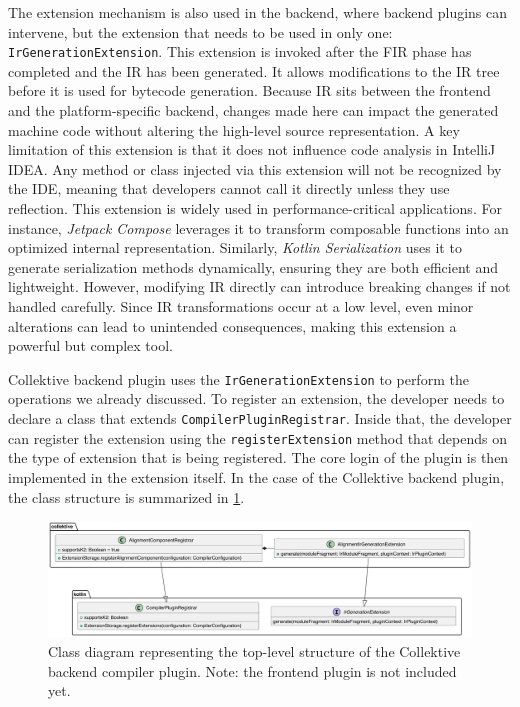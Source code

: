\documentclass[12pt,a4paper,openright,twoside]{book}
\begin{document}
The extension mechanism is also used in the backend, where backend plugins can
intervene, but the extension that needs to be used in only one:
\lstinline{IrGenerationExtension}. This extension is invoked after the \ac{FIR}
phase has completed and the \ac{IR} has been generated. It allows modifications
to the IR tree before it is used for bytecode generation. Because IR sits
between the frontend and the platform-specific backend, changes made here can
impact the generated machine code without altering the high-level source
representation. 
%
A key limitation of this extension is that it does not influence code analysis
in IntelliJ IDEA. Any method or class injected via this extension will not be
recognized by the IDE, meaning that developers cannot call it directly unless
they use reflection. This extension is widely used in performance-critical
applications. For instance, \emph{Jetpack Compose} leverages it to transform
composable functions into an optimized internal representation. Similarly,
\emph{Kotlin Serialization} uses it to generate serialization methods dynamically,
ensuring they are both efficient and lightweight. However, modifying IR directly
can introduce breaking changes if not handled carefully. Since IR
transformations occur at a low level, even minor alterations can lead to
unintended consequences, making this extension a powerful but complex tool.

Collektive backend plugin uses the \lstinline{IrGenerationExtension} to perform 
the operations we already discussed. To register an extension, the developer needs
to declare a class that extends \lstinline{CompilerPluginRegistrar}. Inside that,
the developer can register the extension using the \lstinline{registerExtension}
method that depends on the type of extension that is being registered. 
%
The core login of the plugin is then implemented in the extension itself. In the
case of the Collektive backend plugin, the class structure is summarized 
in \cref{fig:extensions-class-diagram}.

\begin{figure}
  \centering
  \includegraphics[width=.9\linewidth]{figures/extensions-class-diagram.pdf}
  \caption{Class diagram representing the top-level structure of the Collektive 
  backend compiler plugin. Note: the frontend plugin is not included yet.}
  \label{fig:extensions-class-diagram}
\end{figure}
\end{document}
